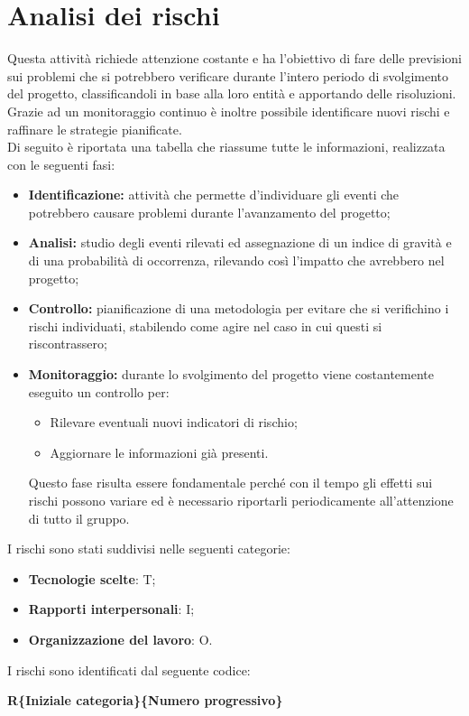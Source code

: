 \section{Analisi dei rischi}

Questa attività richiede attenzione costante e ha l'obiettivo di fare delle previsioni sui problemi che si potrebbero verificare durante l'intero periodo di svolgimento del progetto, classificandoli in base alla loro entità e apportando delle risoluzioni.\\ Grazie ad un monitoraggio continuo è inoltre possibile identificare nuovi rischi e raffinare le strategie pianificate.\\
Di seguito è riportata una tabella che riassume tutte le informazioni, realizzata con le seguenti fasi:
\begin{itemize}
\item \textbf{Identificazione:} attività che permette d'individuare gli eventi che potrebbero causare problemi durante l'avanzamento del progetto;
\item \textbf{Analisi:} studio degli eventi rilevati ed assegnazione di un indice di gravità e di una probabilità di occorrenza, rilevando così l'impatto che avrebbero nel progetto;
\item \textbf{Controllo:} pianificazione di una metodologia per evitare che
si verifichino i rischi individuati, stabilendo come agire nel caso in cui questi si riscontrassero;
\item \textbf{Monitoraggio:} durante lo svolgimento del progetto viene costantemente eseguito un controllo per:
	\begin{itemize}
		\item Rilevare eventuali nuovi indicatori di rischio;
		\item Aggiornare le informazioni già presenti.
	\end{itemize}
Questo fase risulta essere fondamentale perché con il tempo gli effetti sui rischi possono variare ed è necessario riportarli periodicamente all'attenzione di tutto il gruppo.
\end{itemize}
I rischi sono stati suddivisi nelle seguenti categorie:
\begin{itemize}
\item \textbf{Tecnologie scelte}: T;
\item \textbf{Rapporti interpersonali}: I;
\item \textbf{Organizzazione del lavoro}: O.
\end{itemize}
I rischi sono identificati dal seguente codice:
\begin{center}
	\textbf{R\{Iniziale categoria\}\{Numero progressivo\}}
\end{center}
\newpage

